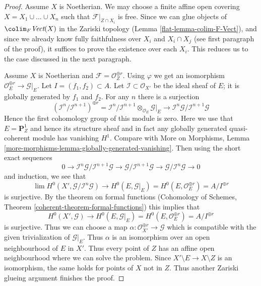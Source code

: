 \begin{proof}
\medskip\noindent
Assume $X$ is Noetherian. We may choose a finite affine open covering
$X = X_1 \cup \ldots \cup X_n$ such that $\mathcal{F}|_{Z \cap X_i}$ is free.
Since we can glue objects of $\colim_F \textit{Vect}(X)$
in the Zariski topology (Lemma \ref{flat-lemma-colim-F-Vect}), and
since we already know
fully faithfulness over $X_i$ and $X_i \cap X_j$ (see first paragraph
of the proof), it suffices to prove the existence over each $X_i$.
This reduces us to the case discussed in the next paragraph.

\medskip\noindent
Assume $X$ is Noetherian and $\mathcal{F} = \mathcal{O}_Z^{\oplus r}$.
Using $\varphi$ we get an isomorphism
$\mathcal{O}_E^{\oplus r} \to \mathcal{G}|_E$.
Let $I = (f_1, f_2) \subset A$.
Let $\mathcal{I} \subset \mathcal{O}_{X'}$
be the ideal sheaf of $E$; it is globally generated by $f_1$ and $f_2$.
For any $n$ there is a surjection
$$
(\mathcal{I}^n/\mathcal{I}^{n + 1})^{\oplus r} =
\mathcal{I}^n/\mathcal{I}^{n + 1} \otimes_{\mathcal{O}_E}
\mathcal{G}|_E \longrightarrow
\mathcal{I}^n\mathcal{G}/\mathcal{I}^{n + 1}\mathcal{G}
$$
Hence the first cohomology group of this module is zero.
Here we use that $E = \mathbf{P}^1_Z$ and hence its structure
sheaf and in fact any globally generated quasi-coherent module
has vanishing $H^1$. Compare with More on Morphisms, Lemma
\ref{more-morphisms-lemma-globally-generated-vanishing}.
Then using the short exact sequences
$$
0 \to  \mathcal{I}^n\mathcal{G}/\mathcal{I}^{n + 1}\mathcal{G} \to
\mathcal{G}/\mathcal{I}^{n + 1}\mathcal{G} \to
\mathcal{G}/\mathcal{I}^n\mathcal{G} \to 0
$$
and induction, we see that
$$
\lim H^0(X', \mathcal{G}/\mathcal{I}^n\mathcal{G})
\to
H^0(E, \mathcal{G}|_E) = H^0(E, \mathcal{O}_E^{\oplus r}) =
A/I^{\oplus r}
$$
is surjective. By the theorem on formal functions
(Cohomology of Schemes, Theorem \ref{coherent-theorem-formal-functions})
this implies that
$$
H^0(X', \mathcal{G}) \to
H^0(E, \mathcal{G}|_E) = H^0(E, \mathcal{O}_E^{\oplus r}) =
A/I^{\oplus r}
$$
is surjective. Thus we can choose a map
$\alpha : \mathcal{O}_{X'}^{\oplus r} \to \mathcal{G}$
which is compatible with the given trivialization
of $\mathcal{G}|_E$. Thus $\alpha$ is an isomorphism over
an open neighbourhood of $E$ in $X'$. Thus every point
of $Z$ has an affine open neighbourhood where
we can solve the problem. Since $X' \setminus E \to X \setminus Z$
is an isomorphism, the same holds for points of $X$ not in $Z$.
Thus another Zariski glueing argument finishes the proof.
\end{proof}


